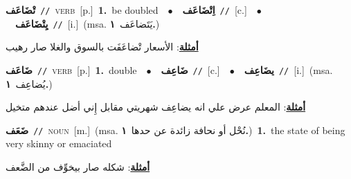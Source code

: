 \documentclass[10pt,a4paper,twoside]{article} %
\begin{document}
\begin{multicols}{2}
{\setlength\topsep{0pt}\textbf{\foreignlanguage{arabic}{تْضَاعَف}}\ {\color{gray}\texttt{//}\color{black}}\ \textsc{verb}\ [p.]\ \textbf{1.}~be doubled\ \ $\bullet$\ \ \setlength\topsep{0pt}\textbf{\foreignlanguage{arabic}{اِتْضَاعَف}}\ {\color{gray}\texttt{//}\color{black}}\ [c.]\ \ $\bullet$\ \ \setlength\topsep{0pt}\textbf{\foreignlanguage{arabic}{يِتْضَاعَف}}\ {\color{gray}\texttt{//}\color{black}}\ [i.]\ \color{gray}(msa. \foreignlanguage{arabic}{يَتَضاعَف}~\foreignlanguage{arabic}{\textbf{١.}})\color{black}\  \begin{flushright}\color{gray}\foreignlanguage{arabic}{\textbf{\underline{\foreignlanguage{arabic}{أمثلة}}}: الأسعار تْضاعَفَت بالسوق والغلا صار رهيب}\end{flushright}\color{black}} \vspace{2mm}

{\setlength\topsep{0pt}\textbf{\foreignlanguage{arabic}{ضَاعَف}}\ {\color{gray}\texttt{//}\color{black}}\ \textsc{verb}\ [p.]\ \textbf{1.}~double\ \ $\bullet$\ \ \setlength\topsep{0pt}\textbf{\foreignlanguage{arabic}{ضَاعِف}}\ {\color{gray}\texttt{//}\color{black}}\ [c.]\ \ $\bullet$\ \ \setlength\topsep{0pt}\textbf{\foreignlanguage{arabic}{يضَاعِف}}\ {\color{gray}\texttt{//}\color{black}}\ [i.]\ \color{gray}(msa. \foreignlanguage{arabic}{يُضاعِف}~\foreignlanguage{arabic}{\textbf{١.}})\color{black}\  \begin{flushright}\color{gray}\foreignlanguage{arabic}{\textbf{\underline{\foreignlanguage{arabic}{أمثلة}}}: المعلم عرض علي انه يضاعِف شهريتي مقابل إِني أضل عندهم متخيل}\end{flushright}\color{black}} \vspace{2mm}

{\setlength\topsep{0pt}\textbf{\foreignlanguage{arabic}{ضَعَف}}\ {\color{gray}\texttt{//}\color{black}}\ \textsc{noun}\ [m.]\ \color{gray}(msa. \foreignlanguage{arabic}{نُحْل أو نحافة زائدة عن حدها}~\foreignlanguage{arabic}{\textbf{١.}})\color{black}\ \textbf{1.}~the state of being very skinny or emaciated\  \begin{flushright}\color{gray}\foreignlanguage{arabic}{\textbf{\underline{\foreignlanguage{arabic}{أمثلة}}}: شكله صار بيخوِّف من الضَّعف}\end{flushright}\color{black}} \vspace{2mm}


\end{multicols}
\end{document}
